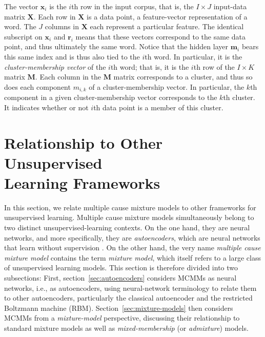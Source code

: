 The vector $\mathbf{x}_i$ is the $i$th row in the 
input corpus, that is, the $I \times J$ input-data matrix $\textbf{X}$. Each 
row in $\textbf{X}$ is a data point, a feature-vector representation of a word. 
The $J$ columns in  $\textbf{X}$ each represent a particular feature.
The identical subscript on $\mathbf{x}_i$ 
and $\mathbf{r}_i$ means that these vectors correspond to the same data 
point, and thus ultimately the same word. Notice that the hidden 
layer $\textbf{m}_i$ bears this same index and is thus also tied to the $i$th word. In particular, it 
is the 
\emph{cluster-membership vector} of the $i$th word; that is, it is the $i$th row of 
the $I \times K$ matrix 
$\mathbf{M}$.  Each column in the $\mathbf{M}$ matrix corresponds to a cluster, and thus so does each component $m_{i,k}$ of a cluster-membership vector. In particular, the $k$th component in a given cluster-membership vector corresponds to the $k$th cluster. It indicates whether or not $i$th data point is a member of this cluster. 

\section{Relationship to Other Unsupervised\\Learning Frameworks}
\label{sec:context}

In this section, we relate multiple cause mixture models to other frameworks for unsupervised learning. 
Multiple cause mixture models simultaneously belong to two distinct unsupervised-learning contexts. 
On the one hand, they are neural networks, and more specifically, they are \emph{autoencoders}, which are neural networks that learn without supervision \citep{bourlard:1988, dayan-and-zemel:95}. %
On the other hand, the very name 
\emph{multiple cause mixture model} 
contains the term \emph{mixture model}, which itself refers to a large class of unsupervised learning models. 
This section is therefore divided into two subsections: First, section~\ref{sec:autoencoders} 
considers MCMMs as neural networks, i.e., as autoencoders, using neural-network terminology 
to relate them to other autoencoders, particularly the classical autoencoder and the restricted Boltzmann machine (RBM).  Section~\ref{sec:mixture-models} then 
considers MCMMs from a \emph{mixture-model} perspective, discussing their 
relationship to standard mixture models as well as \emph{mixed-membership} 
(or \emph{admixture}) models. 

